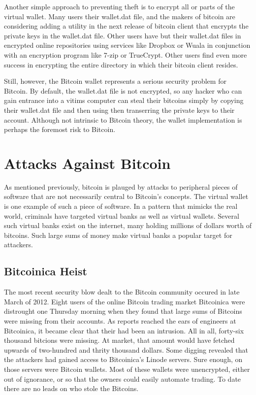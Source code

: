 \documentclass{report}
\begin{document}
Another simple approach to preventing theft is to encrypt all or parts of the virtual 
wallet.  Many users their wallet.dat file, and the makers of bitcoin are considering 
adding a utility in the next release of bitcoin client that encrypts the private keys 
in the wallet.dat file.  Other users have but their wallet.dat files in encrypted online 
repositories using services like Dropbox or Wuala in conjunction with an encryption 
program like 7-zip or TrueCrypt.  Other users find even more success in encrypting the 
entire directory in which their bitcoin client resides.

Still, however, the Bitcoin wallet represents a serious security problem for Bitcoin.  
By default, the wallet.dat file is not encrypted, so any hacker who can gain entrance 
into a vitims computer can steal their bitcoins simply by copying their wallet.dat file 
and then using then transerring the private keys to their account.  Although not intrinsic 
to Bitcoin theory, the wallet implementation is perhaps the foremost risk to Bitcoin.

\section*{Attacks Against Bitcoin}
As mentioned previously, bitcoin is plauged by attacks to peripheral pieces of software 
that are not necessarily central to Bitcoin's concepts.  The virtual wallet is one example
of such a piece of software.  In a pattern that mimicks the real world, criminals have
targeted virtual banks as well as virtual wallets.  Several such virtual banks exist on
the internet, many holding millions of dollars worth of bitcoins.  Such large sums of 
money make virtual banks a popular target for attackers.

\subsection*{Bitcoinica Heist}
The most recent security blow dealt to the Bitcoin community occured in late March of
2012\cite{Goodwin:Bitcoinica}.  Eight users of the online Bitcoin trading market Bitcoinica were distrought one
Thursday morning when they found that large sums of Bitcoins were missing from their 
accounts.  As reports reached the ears of engineers at Bitcoinica, it became clear that
their had been an intrusion.  All in all, forty-six thousand bitcions were missing.  At
market, that amount would have fetched upwards of two-hundred and thrity thousand dollars.
Some digging revealed that the attackers had gained access to Bitcoinica's Linode servers.
Sure enough, on those servers were Bitcoin wallets.  Most of these wallets were unencrypted,
either out of ignorance, or so that the owners could easily automate trading.  To date there
are no leads on who stole the Bitcoins.
\end{document}
